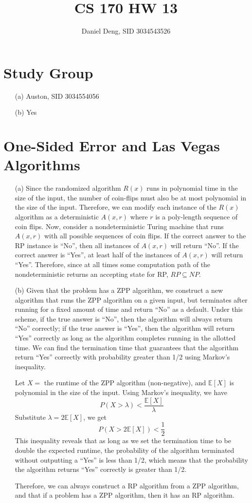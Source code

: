 \documentclass[11pt]{article}
\title{CS 170 HW 13}
\author{Daniel Deng, SID 3034543526}
\date{}
\theoremstyle{definition}
\theoremstyle{remark}
\begin{document}
\maketitle

\section{Study Group}
\begin{enumerate}
\item[(a)] Auston, SID 3034554056
\item[(b)] Yes
\end{enumerate}
\clearpage

\section{One-Sided Error and Las Vegas Algorithms}
\begin{enumerate}
\item[(a)]
Since the randomized algorithm $R(x)$ runs in polynomial time in the size of the input, the number of coin-flips must also be at most polynomial in the size of the input. Therefore, we can modify each instance of the $R(x)$ algorithm as a deterministic $A(x,r)$ where $r$ is a poly-length sequence of coin flips. Now, consider a nondeterministic Turing machine that runs $A(x,r)$ with all possible sequences of coin flips. If the correct answer to the RP instance is ``No'', then all instances of $A(x,r)$ will return ``No''. If the correct answer is ``Yes'', at least half of the instances of $A(x,r)$ will return ``Yes''. Therefore, since at all times some computation path of the nondeterministic returns an accepting state for RP, $RP \subseteq NP$.

\item[(b)]
Given that the problem has a ZPP algorithm, we construct a new algorithm that runs the ZPP algorithm on a given input, but terminates after running for a fixed amount of time and return ``No'' as a default. Under this scheme, if the true answer is ``No'', then the algorithm will always return ``No'' correctly; if the true answer is ``Yes'', then the algorithm will return ``Yes'' correctly as long as the algorithm completes running in the allotted time. We can find the termination time that guarantees that the algorithm return ``Yes'' correctly with probability greater than 1/2 using Markov's inequality. 

Let $X = $ the runtime of the ZPP algorithm (non-negative), and $\mathbb{E}[X]$ is polynomial in the size of the input. Using Markov's inequality, we have
\[
P(X>\lambda) < \frac{\mathbb{E}[X]}{\lambda}
\]
Substitute $\lambda = 2\mathbb{E}[X]$, we get
\[
P(X > 2\mathbb{E}[X]) < \frac{1}{2}
\]
This inequality reveals that as long as we set the termination time to be double the expected runtime, the probability of the algorithm terminated without outputting a ``Yes'' is less than 1/2, which means that the probability the algorithm returns ``Yes'' correctly is greater than 1/2.

Therefore, we can always construct a RP algorithm from a ZPP algorithm, and that if a problem has a ZPP algorithm, then it has an RP algorithm.
\end{enumerate}
\clearpage
\end{document}
